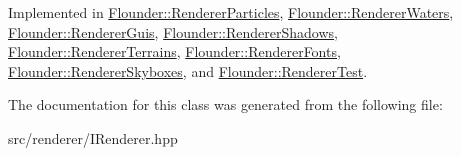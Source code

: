 Implemented in \hyperlink{class_flounder_1_1_renderer_particles_a6ea635663814d5edea980422674fc107}{Flounder\+::\+Renderer\+Particles}, \hyperlink{class_flounder_1_1_renderer_waters_ac48fe095f41d641fb51a26abe4b1ed6a}{Flounder\+::\+Renderer\+Waters}, \hyperlink{class_flounder_1_1_renderer_guis_ad408b843ad27594ab940c11659b2e619}{Flounder\+::\+Renderer\+Guis}, \hyperlink{class_flounder_1_1_renderer_shadows_a39c5548d3cbe75ce7bfe346d209af7a9}{Flounder\+::\+Renderer\+Shadows}, \hyperlink{class_flounder_1_1_renderer_terrains_a80430446c6982b2598de3f437d7097e3}{Flounder\+::\+Renderer\+Terrains}, \hyperlink{class_flounder_1_1_renderer_fonts_a98049021a5e71c025ee9d38a23e07454}{Flounder\+::\+Renderer\+Fonts}, \hyperlink{class_flounder_1_1_renderer_skyboxes_a27115faed1ab81350a8f718203f3c4bd}{Flounder\+::\+Renderer\+Skyboxes}, and \hyperlink{class_flounder_1_1_renderer_test_ac2f0fc96a55b781fd401ad4f0fbde851}{Flounder\+::\+Renderer\+Test}.



The documentation for this class was generated from the following file\+:\begin{DoxyCompactItemize}
\item 
src/renderer/I\+Renderer.\+hpp\end{DoxyCompactItemize}
